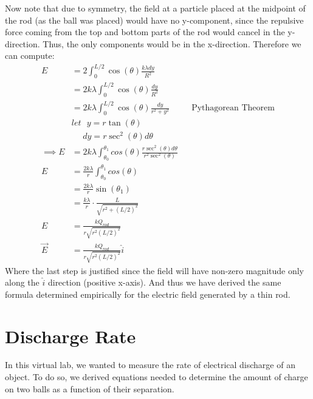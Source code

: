 \documentclass[oneside,12pt]{amsart}
\begin{document}
	\indent Now note that due to symmetry, the field at a particle placed at the midpoint of the rod (as the ball was placed) would have no y-component, since the repulsive force coming from the top and bottom parts of the rod would cancel in the y-direction. Thus, the only components would be in the x-direction. Therefore we can compute:
	\begin{align*}
	E &= 2\int_0^{L/2}\cos(\theta)\frac{k\lambda dy}{R^2}\\
	&=2k\lambda \int_0^{L/2} \cos(\theta)\frac{dy}{R^2}\\
	&=2k\lambda \int_0^{L/2} \cos(\theta)\frac{dy}{r^2+y^2} &&\text{Pythagorean Theorem}\\
	&let\:\:\:y=r\tan(\theta)\\
	&\:\:\: \:\:\:dy = r\sec^2(\theta)d\theta\\
	\implies E&=2k\lambda \int_{\theta_0}^{\theta_1} cos(\theta) \frac{r\sec^2(\theta)d\theta}{r^2\sec^2(\theta)}\\
	E&=\frac{2k\lambda}{r} \int_{\theta_0}^{\theta_1} cos(\theta) \\
	&=\frac{2k\lambda}{r}\sin(\theta_1)\\
	&=\frac{k\lambda}{r}\cdot\frac{L}{\sqrt{r^2+(L/2)^2}}\\
	E&= \frac{kQ_{rod}}{r\sqrt{r^2(L/2)^2}}\\
	\vec{E} &=  \frac{kQ_{rod}}{r\sqrt{r^2(L/2)^2}}\hat{i}
	\end{align*}
	Where the last step is justified since the field will have non-zero magnitude only along the $\hat{i}$ direction (positive x-axis).
	And thus we have derived the same formula determined empirically for the electric field generated by a thin rod.
	
	\section{Discharge Rate}
	In this virtual lab, we wanted to measure the rate of electrical discharge of an object. To do so, we derived equations needed to determine the amount of charge on two balls as a function of their separation.\\
	
\end{document}
